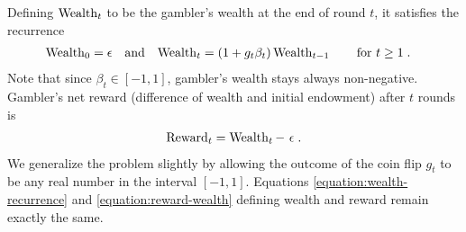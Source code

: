 Defining $\operatorname{Wealth}_t$ to be the gambler's wealth at the end of round $t$, it satisfies the
recurrence
\begin{align}
\label{equation:wealth-recurrence}
\operatorname{Wealth}_0 & = \epsilon &
& \text{and} &
\operatorname{Wealth}_t & = (1 + g_t \beta_t) \operatorname{Wealth}_{t-1} \qquad \text{for $t \ge 1$} \; .
\end{align}
Note that since $\beta_t \in [-1,1]$, gambler's wealth stays always non-negative.
Gambler's net reward (difference of wealth and initial endowment) after $t$
rounds is
\begin{align}
\label{equation:reward-wealth}
\operatorname{Reward}_t = \operatorname{Wealth}_t - \ \epsilon \; .
\end{align}
We generalize the problem slightly by allowing the outcome of the coin flip
$g_t$ to be any real number in the interval $[-1,1]$.
Equations
\eqref{equation:wealth-recurrence} and \eqref{equation:reward-wealth} defining
wealth and reward remain exactly the same.
